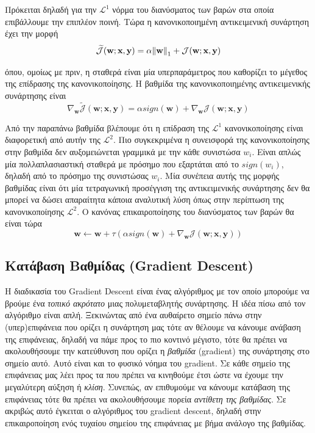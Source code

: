 \documentclass[11pt]{article} %
\numberwithin{equation}{subsection}
\begin{document}
Πρόκειται δηλαδή για την $\mathcal{L}^{1}$ νόρμα του διανύσματος των βαρών στα οποία επιβάλλουμε την επιπλέον ποινή. Τώρα η κανονικοποιημένη αντικειμενική συνάρτηση έχει την μορφή
\begin{equation}
 \widetilde{\mathcal{J}}(\textbf{w}; \textbf{x}, \textbf{y}) = \alpha \norm{\textbf{w}}_{1} + \mathcal{J}(\textbf{w}; \textbf{x}, \textbf{y})
\end{equation}

όπου, ομοίως με πριν, η σταθερά \alpha είναι μία υπερπαράμετρος που καθορίζει το μέγεθος της επίδρασης της κανονικοποίησης. Η βαθμίδα της κανονικοποιημένης αντικειμενικής συνάρτησης είναι 
\begin{equation}
\nabla_{\textbf{w}} \widetilde{\mathcal{J}}(\textbf{w}; \textbf{x}, \textbf{y})  = \alpha sign(\textbf{w}) + \nabla_{\textbf{w}} \mathcal{J}(\textbf{w}; \textbf{x}, \textbf{y})
\end{equation}

Από την παραπάνω βαθμίδα βλέπουμε ότι η επίδραση της $\mathcal{L}^{1}$ κανονικοποίησης είναι διαφορετική από αυτήν της $\mathcal{L}^{2}$. Πιο συγκεκριμένα η συνεισφορά της κανονικοποίησης στην βαθμίδα δεν αυξομειώνεται γραμμικά με την κάθε συνιστώσα $w_{i}$. Είναι απλώς μία πολλαπλασιαστική σταθερά \alpha με πρόσημο που εξαρτάται από το $sign(w_{i})$, δηλαδή από το πρόσημο της συνιστώσας $w_{i}$. Μία συνέπεια αυτής της μορφής βαθμίδας είναι ότι μία τετραγωνική προσέγγιση της αντικειμενικής συνάρτησης δεν θα μπορεί να δώσει απαραίτητα κάποια αναλυτική λύση όπως στην περίπτωση της κανονικοποίησης $\mathcal{L}^{2}$. Ο κανόνας επικαιροποίησης του διανύσματος των βαρών θα είναι τώρα
\begin{equation}
\textbf{w} \leftarrow \textbf{w} + \tau(\alpha sign(\textbf{w}) + \nabla_{\textbf{w}} \mathcal{J}(\textbf{w}; \textbf{x}, \textbf{y}))
\end{equation}




\subsection{Κατάβαση Βαθμίδας (Gradient Descent)}

Η διαδικασία του Gradient Descent είναι ένας αλγόριθμος με τον οποίο μπορούμε να βρούμε ένα \textit{τοπικό ακρότατο} μιας πολυμεταβλητής συνάρτησης. Η ιδέα πίσω από τον αλγόριθμο είναι απλή. Ξεκινώντας από ένα αυθαίρετο σημείο πάνω στην (υπερ)επιφάνεια που ορίζει η συνάρτηση μας τότε αν θέλουμε να κάνουμε ανάβαση της επιφάνειας, δηλαδή να πάμε προς το πιο κοντινό μέγιστο, τότε θα πρέπει να ακολουθήσουμε την κατεύθυνση που ορίζει η \textit{βαθμίδα} (gradient) της συνάρτησης στο σημείο αυτό. Αυτό είναι και το φυσικό νόημα του gradient. Σε κάθε σημείο της επιφάνειας μας λέει προς τα που πρέπει να κινηθούμε έτσι ώστε να έχουμε την μεγαλύτερη αύξηση ή \textit{κλίση}. Συνεπώς, αν επιθυμούμε να κάνουμε κατάβαση της επιφάνειας τότε θα πρέπει να ακολουθήσουμε πορεία \textit{αντίθετη της βαθμίδας}. Σε ακριβώς αυτό έγκειται ο αλγόριθμος του gradient descent, δηλαδή στην επικαιροποίηση ενός τυχαίου σημείου της επιφάνειας με βήμα ανάλογο της βαθμίδας.\\
\end{document}

